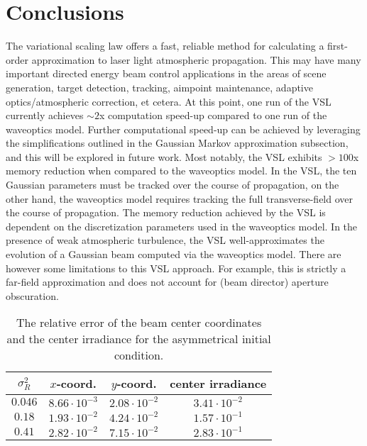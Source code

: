 \documentclass[9pt,twocolumn,twoside]{osajnl}
\begin{document}
\section{Conclusions}

The variational scaling law offers a fast, reliable method for calculating a first-order approximation to laser light atmospheric propagation.  
This may have many important directed energy beam control applications in the areas of scene generation, target 
detection, tracking, aimpoint maintenance, adaptive optics/atmospheric correction, et cetera. 
At this point, one run of the VSL currently achieves $\sim2$x computation speed-up compared to one run of the waveoptics model. Further computational speed-up can be achieved by leveraging the simplifications outlined in the Gaussian Markov approximation subsection, and this will be explored in future work. 
Most notably, the VSL exhibits $>100$x memory reduction when compared to the waveoptics model. In the VSL, the ten Gaussian parameters must be tracked over the course of propagation, on the other hand, the waveoptics model requires tracking the full transverse-field over the course of propagation.
The memory reduction achieved by the VSL is dependent on the discretization parameters used in the waveoptics model. 
In the presence of weak atmospheric turbulence, the VSL well-approximates the evolution of a Gaussian beam computed via the waveoptics model. 
There are however some limitations to this VSL approach.
For example, this is strictly a far-field approximation and does not account for (beam director) aperture obscuration.  
 \begin{table}[!b]
    \centering \vspace*{-3mm}
\caption{The relative error of the beam center coordinates and the center irradiance for the asymmetrical initial condition.}
    \label{tab:CenterCoordAndCenterIrrErr}
    \begin{tabular}{c c c c }
    \hline 
         $\sigma_{R}^2$ & $x$-coord. & $y$-coord. & center irradiance \\
         \hline
         $0.046$ &  $8.66\cdot 10^{-3}$ & $2.08\cdot 10^{-2}$ & $3.41\cdot 10^{-2}$ \\
         $0.18$ & $1.93\cdot 10^{-2}$ & $4.24\cdot 10^{-2}$ & $1.57 \cdot 10^{-1}$\\
         $0.41$ & $2.82\cdot 10^{-2}$ & $7.15\cdot 10^{-2}$ & $2.83\cdot 10^{-1}$\\
         \hline 
    \end{tabular}
\end{table}
\end{document}
